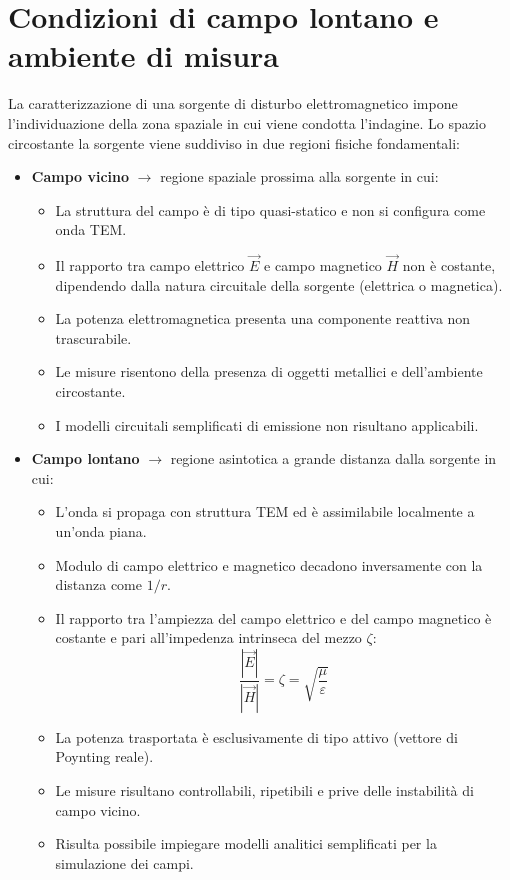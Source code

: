 \section{Condizioni di campo lontano e ambiente di misura}
La caratterizzazione di una sorgente di disturbo elettromagnetico impone l'individuazione della zona spaziale in cui viene condotta l'indagine. Lo spazio circostante la sorgente viene suddiviso in due regioni fisiche fondamentali:
\begin{itemize}
    \item \textbf{Campo vicino} $\rightarrow$ regione spaziale prossima alla sorgente in cui:
    \begin{itemize}
        \item La struttura del campo è di tipo quasi-statico e non si configura come onda TEM.
        \item Il rapporto tra campo elettrico $\vec{E}$ e campo magnetico $\vec{H}$ non è costante, dipendendo dalla natura circuitale della sorgente (elettrica o magnetica).
        \item La potenza elettromagnetica presenta una componente reattiva non trascurabile.
        \item Le misure risentono della presenza di oggetti metallici e dell'ambiente circostante.
        \item I modelli circuitali semplificati di emissione non risultano applicabili.
    \end{itemize}
    \item \textbf{Campo lontano} $\rightarrow$ regione asintotica a grande distanza dalla sorgente in cui:
    \begin{itemize}
        \item L'onda si propaga con struttura TEM ed è assimilabile localmente a un'onda piana.
        \item Modulo di campo elettrico e magnetico decadono inversamente con la distanza come $1/r$.
        \item Il rapporto tra l'ampiezza del campo elettrico e del campo magnetico è costante e pari all'impedenza intrinseca del mezzo $\zeta$:
        \[
        \frac{|\vec{E}|}{|\vec{H}|} = \zeta = \sqrt{\frac{\mu}{\varepsilon}}
        \]
        \item La potenza trasportata è esclusivamente di tipo attivo (vettore di Poynting reale).
        \item Le misure risultano controllabili, ripetibili e prive delle instabilità di campo vicino.
        \item Risulta possibile impiegare modelli analitici semplificati per la simulazione dei campi.
    \end{itemize}
\end{itemize}

